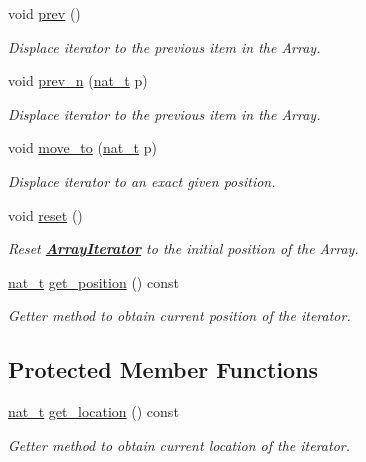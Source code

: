\begin{DoxyCompactItemize}
void \hyperlink{class_designar_1_1_array_iterator_a5a0fd9640ab487a6034fec8f4f3d34cb}{prev} ()
\begin{DoxyCompactList}\small\item\em Displace iterator to the previous item in the Array. \end{DoxyCompactList}\item 
void \hyperlink{class_designar_1_1_array_iterator_a5a417cab0b0b039c69d5a52a513a019f}{prev\+\_\+n} (\hyperlink{namespace_designar_aa72662848b9f4815e7bf31a7cf3e33d1}{nat\+\_\+t} p)
\begin{DoxyCompactList}\small\item\em Displace iterator to the previous item in the Array. \end{DoxyCompactList}\item 
void \hyperlink{class_designar_1_1_array_iterator_a68f6d13686360c93d95b3a875b14312e}{move\+\_\+to} (\hyperlink{namespace_designar_aa72662848b9f4815e7bf31a7cf3e33d1}{nat\+\_\+t} p)
\begin{DoxyCompactList}\small\item\em Displace iterator to an exact given position. \end{DoxyCompactList}\item 
void \hyperlink{class_designar_1_1_array_iterator_af8781369a1cb13f92c8c2dbab9975118}{reset} ()
\begin{DoxyCompactList}\small\item\em Reset {\bfseries \hyperlink{class_designar_1_1_array_iterator}{Array\+Iterator}} to the initial position of the Array. \end{DoxyCompactList}\item 
\hyperlink{namespace_designar_aa72662848b9f4815e7bf31a7cf3e33d1}{nat\+\_\+t} \hyperlink{class_designar_1_1_array_iterator_a209ca14a9628f0a67a258469d98089b8}{get\+\_\+position} () const
\begin{DoxyCompactList}\small\item\em Getter method to obtain current position of the iterator. \end{DoxyCompactList}\end{DoxyCompactItemize}
\subsection*{Protected Member Functions}
\begin{DoxyCompactItemize}
\item 
\hyperlink{namespace_designar_aa72662848b9f4815e7bf31a7cf3e33d1}{nat\+\_\+t} \hyperlink{class_designar_1_1_array_iterator_a55fa01dfdb66a82b162ea2c9f631e2fd}{get\+\_\+location} () const
\begin{DoxyCompactList}\small\item\em Getter method to obtain current location of the iterator. \end{DoxyCompactList}\end{DoxyCompactItemize}
